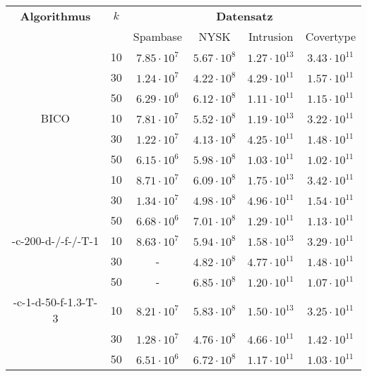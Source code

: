 \begin{table}[h]
\centering
\begin{tabular}{@{}cccccc@{}} \toprule
	\textbf{Algorithmus} & $k$ & \multicolumn{4}{c}{\textbf{Datensatz}} \\
	\cmidrule(r){3-6} & 		& Spambase 				& NYSK 				& Intrusion 			& Covertype \\ \toprule
	\Skmpp 						& 10 & $7.85 \cdot 10^7$ & $5.67 \cdot 10^8$ & $1.27 \cdot 10^{13}$ & $3.43 \cdot 10^{11}$ \\
		 						& 30 & $1.24 \cdot 10^7$ & $4.22 \cdot 10^8$ & $4.29 \cdot 10^{11}$ & $1.57 \cdot 10^{11}$ \\
		 						& 50 & $6.29 \cdot 10^6$ & $6.12 \cdot 10^8$ & $1.11 \cdot 10^{11}$ & $1.15 \cdot 10^{11}$ \\
	\midrule
	BICO 						& 10 & $7.81 \cdot 10^7$ & $5.52 \cdot 10^8$ & $1.19 \cdot 10^{13}$ & $3.22 \cdot 10^{11}$ \\
			 					& 30 & $1.22 \cdot 10^7$ & $4.13 \cdot 10^8$ & $4.25 \cdot 10^{11}$ & $1.48 \cdot 10^{11}$ \\
		 						& 50 & $6.15 \cdot 10^6$ & $5.98 \cdot 10^8$ & $1.03 \cdot 10^{11}$ & $1.02 \cdot 10^{11}$ \\
	\midrule
	\kmpp 						& 10 & $8.71 \cdot 10^7$ & $6.09 \cdot 10^8$ & $1.75 \cdot 10^{13}$ & $3.42 \cdot 10^{11}$ \\
			 					& 30 & $1.34 \cdot 10^7$ & $4.98 \cdot 10^8$ & $4.96 \cdot 10^{11}$ & $1.54 \cdot 10^{11}$ \\
		 						& 50 & $6.68 \cdot 10^6$ & $7.01 \cdot 10^8$ & $1.29 \cdot 10^{11}$ & $1.13 \cdot 10^{11}$ \\
	\midrule
	\KCsTwo-c-200-d-/-f-/-T-1	& 10 & $8.63 \cdot 10^7$ & $5.94 \cdot 10^8$ & $1.58 \cdot 10^{13}$ & $3.29 \cdot 10^{11}$ \\
			 					& 30 & - 				& $4.82 \cdot 10^8$ & $4.77 \cdot 10^{11}$ & $1.48 \cdot 10^{11}$ \\
		 						& 50 & - 				& $6.85 \cdot 10^8$	& $1.20 \cdot 10^{11}$ & $1.07 \cdot 10^{11}$ \\
	\midrule
	\KCsTwo-c-1-d-50-f-1.3-T-3	& 10 & $8.21 \cdot 10^7$ & $5.83 \cdot 10^8$ & $1.50 \cdot 10^{13}$ & $3.25 \cdot 10^{11}$ \\
			 					& 30 & $1.28 \cdot 10^7$ & $4.76 \cdot 10^8$ & $4.66 \cdot 10^{11}$ & $1.42 \cdot 10^{11}$ \\
		 						& 50 & $6.51 \cdot 10^6$ & $6.72 \cdot 10^8$ & $1.17 \cdot 10^{11}$ & $1.03 \cdot 10^{11}$ \\
	\midrule

\end{tabular}
\end{table}

